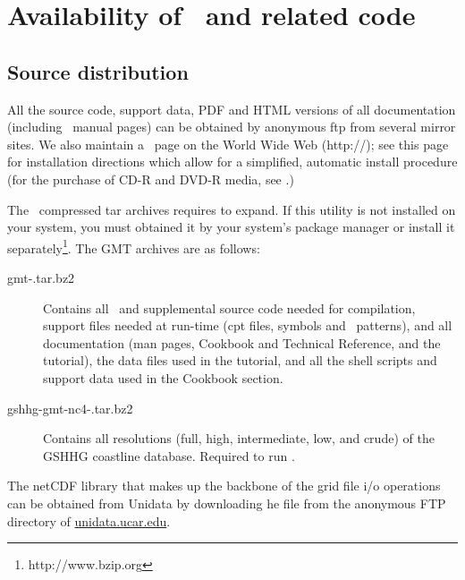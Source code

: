 %
%
\chapter{Availability of \gmt\ and related code}
\label{app:D}
\thispagestyle{headings}

\section{Source distribution}
All the source code, support data, PDF
and HTML versions of all documentation (including \UNIX\
manual pages) can be obtained by anonymous
ftp from several mirror sites.  We also maintain a \GMT\
page on the World Wide Web (http://\GMTSITE);
see this page for installation directions 
which allow for a simplified, automatic install procedure
(for the purchase of CD-R and DVD-R media, see .)

The \GMT\ compressed tar archives requires \progname{bzip2} to expand.  If this utility
is not installed on your system, you must obtained it by your system's package manager
or install it separately\footnote{http://www.bzip.org}.
The GMT archives are as follows:

\begin{description}

\item[gmt-\GMTDOCVERSION.tar.bz2] Contains all \GMT\ and supplemental source code needed for compilation, support files
	needed at run-time (cpt files, symbols and \PS\ patterns), and all documentation
	(man pages, Cookbook and Technical Reference, and the tutorial), the data files
	used in the tutorial, and all the shell scripts and support data used in the Cookbook section.

\item[gshhg-gmt-nc4-\GSHHGVERSION.tar.bz2] Contains all resolutions (full, high, intermediate,
low, and crude) of the GSHHG coastline database.  Required to run \GMT.

\end{description}


The netCDF library that makes up the backbone of the grid file
i/o operations can be obtained from Unidata by downloading he file
\filename{netcdf.tar.Z} from the anonymous FTP directory of
\underline{unidata.ucar.edu}.

